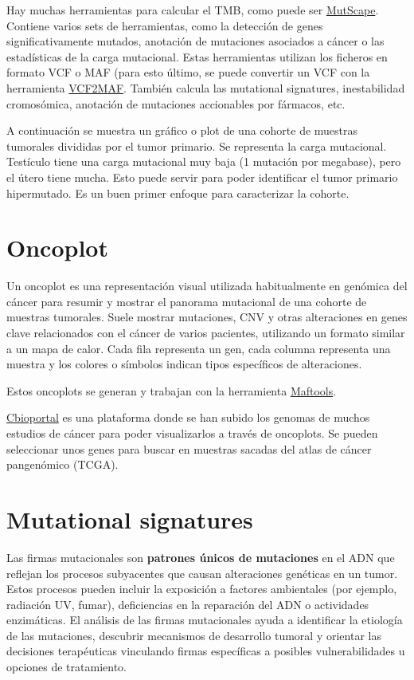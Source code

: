 Hay muchas herramientas para calcular el TMB, como puede ser \href{https://github.com/anitalu724/MutScape}{MutScape}. Contiene varios sets de herramientas, como la detección de genes significativamente mutados, anotación de mutaciones asociados a cáncer o las estadísticas de la carga mutacional. Estas herramientas utilizan los ficheros en formato VCF o MAF (para esto último, se puede convertir un VCF con la herramienta \href{https://github.com/mskcc/vcf2maf}{VCF2MAF}. También calcula las mutational signatures, inestabilidad cromosómica, anotación de mutaciones accionables por fármacos, etc. 

A continuación se muestra un gráfico o plot de una cohorte de muestras tumorales divididas por el tumor primario. Se representa la carga mutacional. Testículo tiene una carga mutacional muy baja (1 mutación por megabase), pero el útero tiene mucha. Esto puede servir para poder identificar el tumor primario hipermutado. Es un buen primer enfoque para caracterizar la cohorte.


\section{Oncoplot}
Un oncoplot es una representación visual utilizada habitualmente en genómica del cáncer para resumir y mostrar el panorama mutacional de una cohorte de muestras tumorales. Suele mostrar mutaciones, CNV y otras alteraciones en genes clave relacionados con el cáncer de varios pacientes, utilizando un formato similar a un mapa de calor. Cada fila representa un gen, cada columna representa una muestra y los colores o símbolos indican tipos específicos de alteraciones.


Estos oncoplots se generan y trabajan con la herramienta \href{https://bioconductor.org/packages/devel/bioc/vignettes/maftools/inst/doc/maftools.html}{Maftools}. 

\href{https://www.cbioportal.org/}{Cbioportal} es una plataforma donde se han subido los genomas de muchos estudios de cáncer para poder visualizarlos a través de oncoplots. Se pueden seleccionar unos genes para buscar en muestras sacadas del atlas de cáncer pangenómico (TCGA). 

\section{Mutational signatures}
Las firmas mutacionales son \textbf{patrones únicos de mutaciones} en el ADN que reflejan los procesos subyacentes que causan alteraciones genéticas en un tumor. Estos procesos pueden incluir la exposición a factores ambientales (por ejemplo, radiación UV, fumar), deficiencias en la reparación del ADN o actividades enzimáticas. El análisis de las firmas mutacionales ayuda a identificar la etiología de las mutaciones, descubrir mecanismos de desarrollo tumoral y orientar las decisiones terapéuticas vinculando firmas específicas a posibles vulnerabilidades u opciones de tratamiento.

